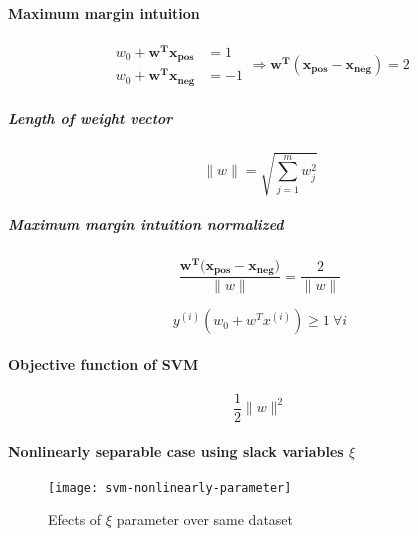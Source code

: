 \documentclass{article}
\begin{document}
				\paragraph{Maximum margin intuition}
					\begin{equation}
						\begin{aligned}
							w_0 + \boldsymbol{w^T x_{pos}} & = 1 \\
							w_0 + \boldsymbol{w^T x_{neg}} & = -1
						\end{aligned}
						\Rightarrow \boldsymbol{w^T (x_{pos} - x_{neg})} = 2
					\end{equation}
					
					\subparagraph{Length of weight vector}
					
					\begin{equation}
						\|w\| = \sqrt{\sum_{j=1}^m w_j^2}
					\end{equation}
					
					\subparagraph{Maximum margin intuition normalized}
					
					\begin{equation}
						\frac{\boldsymbol{w^T (x_{pos}-x_{neg}})}{\|w\|} = \frac{2}{\|w\|}
					\end{equation}
				
					\begin{equation}
						y^{(i)}(w_0 + w^T x^{(i)}) \geq 1 \ \forall i
					\end{equation}
				
				\paragraph{Objective function of SVM}
				
					\begin{equation}
						\frac{1}{2}	\|w\|^2
					\end{equation}
				
				\paragraph{Nonlinearly separable case using slack variables $\xi$}
				
					\begin{figure}
						\centering
						\texttt{[image: svm-nonlinearly-parameter]}
						\caption{Efects of $\xi$ parameter over same dataset}
						\label{fig:svm-nonlinearly-parameter}
					\end{figure}
				
\end{document}
